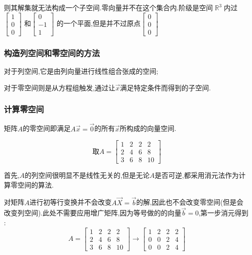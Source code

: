 \documentclass[UTF8,12pt]{ctexbook}
\DeclareMathOperator{\mathRealNumberCollection}{\mathbb{R}}
\begin{document}
{{{{{  则其解集就无法构成一个子空间.零向量并不在这个集合内.阶级是空间$\mathRealNumberCollection^3$内过$\begin{bmatrix}
      1 \\
      0 \\
      0
    \end{bmatrix}$
  和$\begin{bmatrix}
      0  \\
      -1 \\
      1
    \end{bmatrix}$
  的一个平面,但是并不过原点$\begin{bmatrix}
      0 \\
      0 \\
      0
    \end{bmatrix}$
}%

\subsubsection{构造列空间和零空间的方法}{

  对于列空间,它是由列向量进行线性组合张成的空间;

  对于零空间则是从方程组触发,通过让$\vec{x}$满足特定条件而得到的子空间.

}%

\subsubsection{计算零空间}{
  矩阵$A$的零空间即满足$A\vec{x} = \vec{0}$的所有$\vec{x}$所构成的向量空间.

  $$
    \mbox{取}A = \begin{bmatrix}
      1 & 2 & 2 & 2  \\
      2 & 4 & 6 & 8  \\
      3 & 6 & 8 & 10
    \end{bmatrix}
  $$

  首先,$A$的列空间很明显不是线性无关的,但是无论$A$是否可逆,都采用消元法作为计算零空间的算法.

  对矩阵$A$进行初等行变换并不会改变$A\vec{X} = \vec{b}$的解,因此也不会改变零空间(但是会改变列空间).此处不需要应用增广矩阵,因为等号做的的向量$\vec{b} = 0$,第一步消元得到 : $$
    A = \begin{bmatrix}
      1 & 2 & 2 & 2  \\
      2 & 4 & 6 & 8  \\
      3 & 6 & 8 & 10
    \end{bmatrix}
    \to
    \begin{bmatrix}
      \boxed{1} & 2 & 2 & 2 \\
      0         & 0 & 2 & 4 \\
      0         & 0 & 2 & 4
    \end{bmatrix}
  $$

}}}}}
\end{document}
